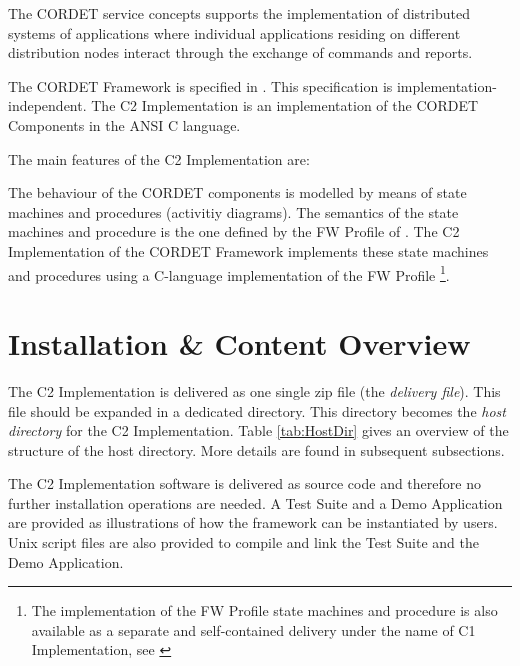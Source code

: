 \documentclass[a4paper,10pt]{article}
\let\stdsection\section
\renewcommand\section{\newpage\stdsection}
\begin{document}
The CORDET service concepts supports the implementation of distributed systems of applications where individual applications residing on different distribution nodes interact through the exchange of commands and reports.

The CORDET Framework is specified in \cite{ref:cordetfw}. This specification is implementation-independent. The C2 Implementation is an implementation of the CORDET Components in the ANSI C language.

The main features of the C2 Implementation are:


The behaviour of the CORDET components is modelled by means of state machines and procedures (activitiy diagrams). The semantics of the state machines and procedure is the one defined by the FW Profile of \cite{ref:fwprofile}. The C2 Implementation of the CORDET Framework implements these state machines and procedures using a C-language implementation of the FW Profile \footnote{The implementation of the FW Profile state machines and procedure is also available as a separate and self-contained delivery under the name of C1 Implementation, see \cite{ref:C1Implementation}}. 

\section{Installation \& Content Overview}\label{sec:InstAndContentOverview}
The C2 Implementation is delivered as one single zip file (the \emph{delivery file}).
This file should be expanded in a dedicated directory. 
This directory becomes the \emph{host directory} for the C2 Implementation.
Table \ref{tab:HostDir} gives an overview of the structure of the host directory.
More details are found in subsequent subsections.

The C2 Implementation software is delivered as source code and therefore no further installation operations are needed. A Test Suite and a Demo Application are provided as illustrations of how the framework can be instantiated by users. Unix script files are also provided to compile and link the Test Suite and the Demo Application.
\end{document}
